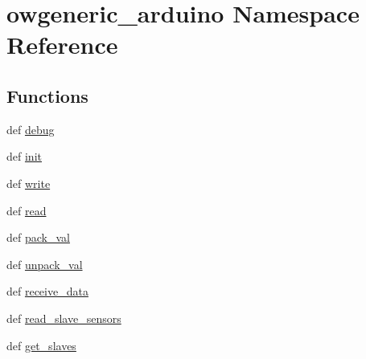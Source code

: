 \hypertarget{namespaceowgeneric__arduino}{\section{owgeneric\-\_\-arduino Namespace Reference}
\label{namespaceowgeneric__arduino}
}
\subsection*{Functions}
\begin{DoxyCompactItemize}
\item 
def \hyperlink{namespaceowgeneric__arduino_ae497352a3cdb1c9f1ea7d074f91dcc4d}{debug}
\item 
def \hyperlink{namespaceowgeneric__arduino_a458d0d97eb930f83d4c268f8fcbebfe3}{init}
\item 
def \hyperlink{namespaceowgeneric__arduino_a260f6453ccb4f90de58cb589490b5a0d}{write}
\item 
def \hyperlink{namespaceowgeneric__arduino_ac4a169bf70be7476d95bea5e5cb11683}{read}
\item 
def \hyperlink{namespaceowgeneric__arduino_a90db891c446b758d69e5a951a20e1701}{pack\-\_\-val}
\item 
def \hyperlink{namespaceowgeneric__arduino_a15035620861d072da5015dcf7c9da4f8}{unpack\-\_\-val}
\item 
def \hyperlink{namespaceowgeneric__arduino_aa3922858daba4732938e40797f08f5f3}{receive\-\_\-data}
\item 
def \hyperlink{namespaceowgeneric__arduino_a45bddba7d6de252bb4870acc38eea491}{read\-\_\-slave\-\_\-sensors}
\item 
def \hyperlink{namespaceowgeneric__arduino_a5d4c78f6f1b5ce9b61e660001a91a033}{get\-\_\-slaves}
\end{DoxyCompactItemize}
